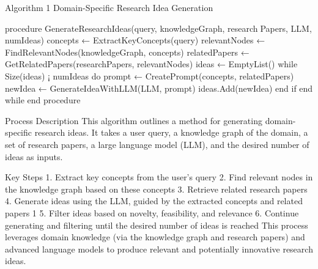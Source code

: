 Algorithm 1 Domain-Specific Research Idea Generation

 procedure GenerateResearchIdeas(query, knowledgeGraph, research￾Papers, LLM, numIdeas)
 concepts ← ExtractKeyConcepts(query)
 relevantNodes ← FindRelevantNodes(knowledgeGraph, concepts)
 relatedPapers ← GetRelatedPapers(researchPapers, relevantNodes)
 ideas ← EmptyList()
 while Size(ideas) ¡ numIdeas do
 prompt ← CreatePrompt(concepts, relatedPapers)
 newIdea ← GenerateIdeaWithLLM(LLM, prompt)
 ideas.Add(newIdea)
 end if
 end while
 end procedure

 Process Description
This algorithm outlines a method for generating domain-specific research ideas.
It takes a user query, a knowledge graph of the domain, a set of research papers,
a large language model (LLM), and the desired number of ideas as inputs.

Key Steps
1. Extract key concepts from the user’s query
2. Find relevant nodes in the knowledge graph based on these concepts
3. Retrieve related research papers
4. Generate ideas using the LLM, guided by the extracted concepts and
related papers
1
5. Filter ideas based on novelty, feasibility, and relevance
6. Continue generating and filtering until the desired number of ideas is
reached
This process leverages domain knowledge (via the knowledge graph and research papers) and advanced language models to produce relevant and potentially innovative research ideas.
